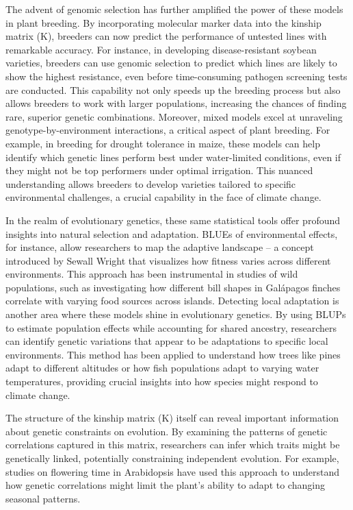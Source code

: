 \documentclass[12pt,a4paper]{article}
\begin{document}
The advent of genomic selection has further amplified the power of these models in plant breeding. By incorporating molecular marker data into the kinship matrix (K), breeders can now predict the performance of untested lines with remarkable accuracy. For instance, in developing disease-resistant soybean varieties, breeders can use genomic selection to predict which lines are likely to show the highest resistance, even before time-consuming pathogen screening tests are conducted. This capability not only speeds up the breeding process but also allows breeders to work with larger populations, increasing the chances of finding rare, superior genetic combinations. Moreover, mixed models excel at unraveling genotype-by-environment interactions, a critical aspect of plant breeding. For example, in breeding for drought tolerance in maize, these models can help identify which genetic lines perform best under water-limited conditions, even if they might not be top performers under optimal irrigation. This nuanced understanding allows breeders to develop varieties tailored to specific environmental challenges, a crucial capability in the face of climate change.

In the realm of evolutionary genetics, these same statistical tools offer profound insights into natural selection and adaptation. BLUEs of environmental effects, for instance, allow researchers to map the adaptive landscape – a concept introduced by Sewall Wright that visualizes how fitness varies across different environments. This approach has been instrumental in studies of wild populations, such as investigating how different bill shapes in Galápagos finches correlate with varying food sources across islands. Detecting local adaptation is another area where these models shine in evolutionary genetics. By using BLUPs to estimate population effects while accounting for shared ancestry, researchers can identify genetic variations that appear to be adaptations to specific local environments. This method has been applied to understand how trees like pines adapt to different altitudes or how fish populations adapt to varying water temperatures, providing crucial insights into how species might respond to climate change.

The structure of the kinship matrix (K) itself can reveal important information about genetic constraints on evolution. By examining the patterns of genetic correlations captured in this matrix, researchers can infer which traits might be genetically linked, potentially constraining independent evolution. For example, studies on flowering time in Arabidopsis have used this approach to understand how genetic correlations might limit the plant's ability to adapt to changing seasonal patterns.
\end{document}

